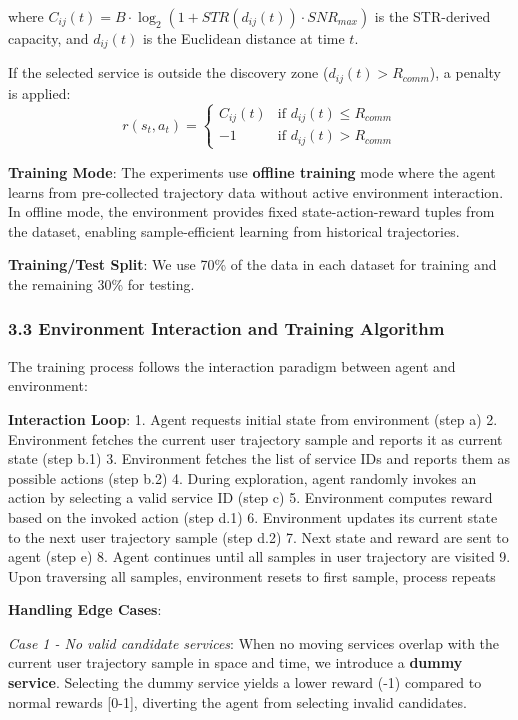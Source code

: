 \documentclass[
  10pt,
  twocolumn,
]{article}
\begin{document}
where \(C_{ij}(t) = B \cdot \log_2(1 + STR(d_{ij}(t)) \cdot SNR_{max})\)
is the STR-derived capacity, and \(d_{ij}(t)\) is the Euclidean distance
at time \(t\).

If the selected service is outside the discovery zone
(\(d_{ij}(t) > R_{comm}\)), a penalty is applied:
\[r(s_t, a_t) = \begin{cases} C_{ij}(t) & \text{if } d_{ij}(t) \leq R_{comm} \\ -1 & \text{if } d_{ij}(t) > R_{comm} \end{cases}\]

\textbf{Training Mode}: The experiments use \textbf{offline training}
mode where the agent learns from pre-collected trajectory data without
active environment interaction. In offline mode, the environment
provides fixed state-action-reward tuples from the dataset, enabling
sample-efficient learning from historical trajectories.

\textbf{Training/Test Split}: We use 70\% of the data in each dataset
for training and the remaining 30\% for testing.

\hypertarget{environment-interaction-and-training-algorithm}{%
	\subsubsection{3.3 Environment Interaction and Training
		Algorithm}\label{environment-interaction-and-training-algorithm}}

The training process follows the interaction paradigm between agent and
environment:

\textbf{Interaction Loop}: 1. Agent requests initial state from
environment (step a) 2. Environment fetches the current user trajectory
sample and reports it as current state (step b.1) 3. Environment fetches
the list of service IDs and reports them as possible actions (step b.2)
4. During exploration, agent randomly invokes an action by selecting a
valid service ID (step c) 5. Environment computes reward based on the
invoked action (step d.1) 6. Environment updates its current state to
the next user trajectory sample (step d.2) 7. Next state and reward are
sent to agent (step e) 8. Agent continues until all samples in user
trajectory are visited 9. Upon traversing all samples, environment
resets to first sample, process repeats

\textbf{Handling Edge Cases}:

\emph{Case 1 - No valid candidate services}: When no moving services
overlap with the current user trajectory sample in space and time, we
introduce a \textbf{dummy service}. Selecting the dummy service yields a
lower reward (-1) compared to normal rewards {[}0-1{]}, diverting the
agent from selecting invalid candidates.
\end{document}
